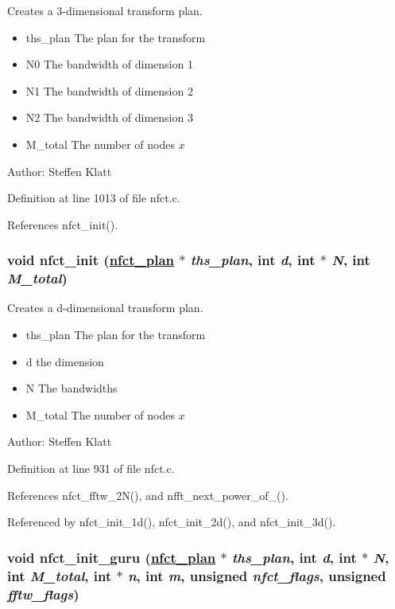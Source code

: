 Creates a 3-dimensional transform plan. 

\begin{itemize}
\item ths\_\-plan The plan for the transform \item N0 The bandwidth of dimension 1 \item N1 The bandwidth of dimension 2 \item N2 The bandwidth of dimension 3 \item M\_\-total The number of nodes $x$\end{itemize}
\begin{Desc}
\item[Author:]Steffen Klatt \end{Desc}


Definition at line 1013 of file nfct.c.

References nfct\_\-init().\hypertarget{group__nfsct_ga3}{
\subsubsection[nfct\_\-init]{\setlength{\rightskip}{0pt plus 5cm}void nfct\_\-init (\hyperlink{structnfct__plan}{nfct\_\-plan} $\ast$ {\em ths\_\-plan}, int {\em d}, int $\ast$ {\em N}, int {\em M\_\-total})}}
\label{group__nfsct_ga3}


Creates a d-dimensional transform plan. 

\begin{itemize}
\item ths\_\-plan The plan for the transform \item d the dimension \item N The bandwidths \item M\_\-total The number of nodes $x$\end{itemize}
\begin{Desc}
\item[Author:]Steffen Klatt \end{Desc}


Definition at line 931 of file nfct.c.

References nfct\_\-fftw\_\-2N(), and nfft\_\-next\_\-power\_\-of\_().

Referenced by nfct\_\-init\_\-1d(), nfct\_\-init\_\-2d(), and nfct\_\-init\_\-3d().\hypertarget{group__nfsct_ga4}{
\subsubsection[nfct\_\-init\_\-guru]{\setlength{\rightskip}{0pt plus 5cm}void nfct\_\-init\_\-guru (\hyperlink{structnfct__plan}{nfct\_\-plan} $\ast$ {\em ths\_\-plan}, int {\em d}, int $\ast$ {\em N}, int {\em M\_\-total}, int $\ast$ {\em n}, int {\em m}, unsigned {\em nfct\_\-flags}, unsigned {\em fftw\_\-flags})}}
\label{group__nfsct_ga4}


